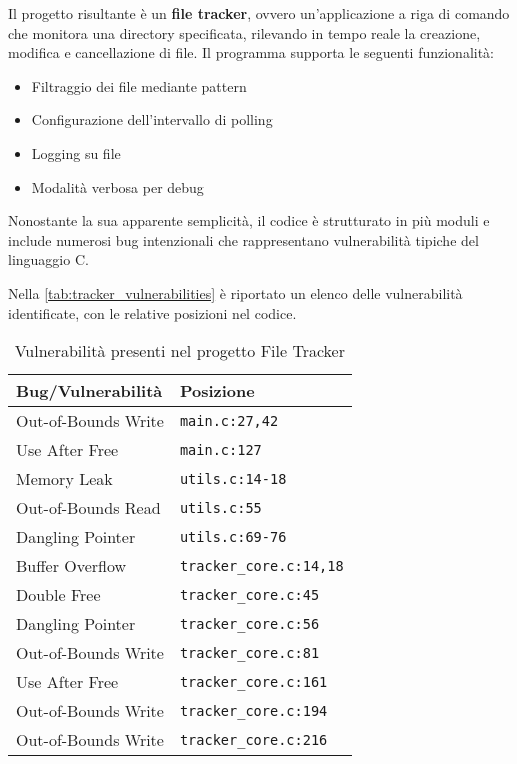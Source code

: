 Il progetto risultante è un \textbf{file tracker}, ovvero un'applicazione a riga
di comando che monitora una directory specificata, rilevando in tempo reale la creazione,
modifica e cancellazione di file. Il programma supporta le seguenti funzionalità:
\begin{itemize}
  \item Filtraggio dei file mediante pattern

  \item Configurazione dell'intervallo di polling

  \item Logging su file

  \item Modalità verbosa per debug
\end{itemize}

Nonostante la sua apparente semplicità, il codice è strutturato in più moduli e
include numerosi bug intenzionali che rappresentano vulnerabilità tipiche del
linguaggio C.

Nella \autoref{tab:tracker_vulnerabilities} è riportato un elenco delle
vulnerabilità identificate, con le relative posizioni nel codice.

\begin{table}[htbp]
  \centering
  \small
  \begin{tabular}{|l|l|}
    \hline
    \textbf{Bug/Vulnerabilità} & \textbf{Posizione}             \\
    \hline
    Out-of-Bounds Write        & \texttt{main.c:27,42}          \\
    \hline
    Use After Free             & \texttt{main.c:127}            \\
    \hline
    Memory Leak                & \texttt{utils.c:14-18}         \\
    \hline
    Out-of-Bounds Read         & \texttt{utils.c:55}            \\
    \hline
    Dangling Pointer           & \texttt{utils.c:69-76}           \\
    \hline
    Buffer Overflow            & \texttt{tracker\_core.c:14,18} \\
    \hline
    Double Free                & \texttt{tracker\_core.c:45}    \\
    \hline
    Dangling Pointer           & \texttt{tracker\_core.c:56}    \\
    \hline
    Out-of-Bounds Write        & \texttt{tracker\_core.c:81}    \\
    \hline
    Use After Free             & \texttt{tracker\_core.c:161}   \\
    \hline
    Out-of-Bounds Write        & \texttt{tracker\_core.c:194}   \\
    \hline
    Out-of-Bounds Write        & \texttt{tracker\_core.c:216}   \\
    \hline
  \end{tabular}
  \caption{Vulnerabilità presenti nel progetto File Tracker}
  \label{tab:tracker_vulnerabilities}
\end{table}

